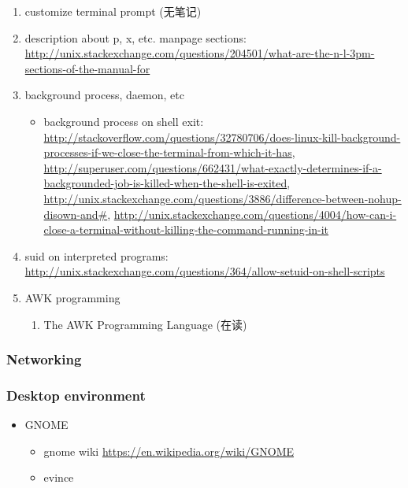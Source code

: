 \documentclass{article}
\begin{document}
\begin{enumerate}
    \item customize terminal prompt (无笔记)
    \item description about p, x, etc. manpage sections: \url{http://unix.stackexchange.com/questions/204501/what-are-the-n-l-3pm-sections-of-the-manual-for}
    \item background process, daemon, etc
        \begin{itemize}
            \item background process on shell exit: \url{http://stackoverflow.com/questions/32780706/does-linux-kill-background-processes-if-we-close-the-terminal-from-which-it-has}, \url{http://superuser.com/questions/662431/what-exactly-determines-if-a-backgrounded-job-is-killed-when-the-shell-is-exited}, \url{http://unix.stackexchange.com/questions/3886/difference-between-nohup-disown-and#}, \url{http://unix.stackexchange.com/questions/4004/how-can-i-close-a-terminal-without-killing-the-command-running-in-it}
        \end{itemize}
    \item suid on interpreted programs: \url{http://unix.stackexchange.com/questions/364/allow-setuid-on-shell-scripts}
    \item AWK programming
        \begin{enumerate}
            \item The AWK Programming Language (在读)
        \end{enumerate}
\end{enumerate}
%
\subsubsection{Networking}
%
\begin{itemize}
\end{itemize}
%
\subsubsection{Desktop environment}
%
\begin{itemize}
    \item GNOME
        \begin{itemize}
            \item gnome wiki \url{https://en.wikipedia.org/wiki/GNOME}
            \item evince
                \begin{itemize}
            
                \end{itemize}
        \end{itemize}
\end{itemize}
%
\end{document}
